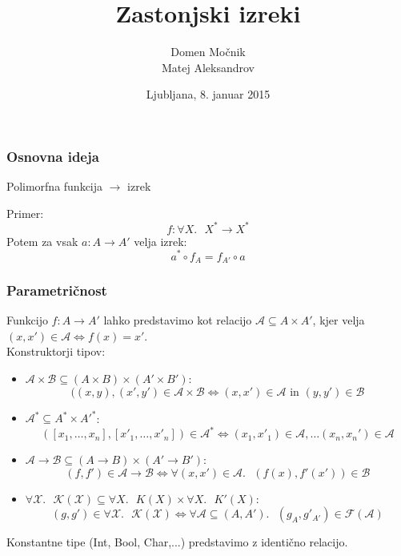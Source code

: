 \documentclass{beamer}
\title{Zastonjski izreki}
\author{Domen Močnik\\
Matej Aleksandrov}
\date{Ljubljana, 8. januar 2015}
\begin{document}
\begin{frame}
	\titlepage
	\end{frame}
	
	
	\begin{frame}
	\frametitle{Osnovna ideja}
	\begin{center}
	Polimorfna funkcija $\rightarrow$ izrek
	\end{center}
	\pause
	Primer:
	\\
	$$f: \forall X .\mbox{ } X^* \rightarrow X^*$$
	Potem za vsak $a: A \rightarrow A'$ velja izrek:
	$$  a^* \circ f_{A} = f_{A'} \circ a $$
	\end{frame}
	
	\begin{frame}
	\frametitle{Parametričnost}
		Funkcijo $f:A \to A'$ lahko predstavimo kot relacijo $\mathcal{A} \subseteq A \times A'$, kjer velja $(x,x')\in \mathcal{A} \Leftrightarrow  f(x)=x'$.\\
		\pause
		Konstruktorji tipov:
		\begin{itemize}
		\item $\mathcal{A}\times \mathcal{B} \subseteq (A \times B) \times (A' \times B')$:
		$$ ((x,y),(x',y') \in \mathcal{A}\times \mathcal{B} \Leftrightarrow (x,x') \in \mathcal{A} \mbox{ in } (y,y') \in \mathcal{B} $$
		\item $\mathcal{A}^* \subseteq A^* \times A'^*$:
		$$ ([x_1, \ldots, x_n],[x'_1, \ldots, x'_n]) \in \mathcal{A}^* \Leftrightarrow (x_1,x'_1) \in \mathcal{A},  \ldots  (x_n,x_n') \in \mathcal{A} $$
		\item $\mathcal{A}\to \mathcal{B} \subseteq (A \to B) \times (A' \to B')$:
		$$ (f,f') \in \mathcal{A}\to \mathcal{B} \Leftrightarrow  \forall (x,x') \in \mathcal{A}.\mbox{ } (f(x),f'(x')) \in \mathcal{B} $$
		\item $\forall \mathcal{X}.\mbox{ } \mathcal{K}(\mathcal{X}) \subseteq \forall X.\mbox{ } K(X) \times \forall X.\mbox{ } K'(X) $:
		$$ (g,g') \in \forall \mathcal{X}.\mbox{ } \mathcal{K}(\mathcal{X})  \Leftrightarrow  \forall \mathcal{A} \subseteq (A,A').\mbox{ } (g_A,g'_{A'}) \in \mathcal{F}(\mathcal{A})$$
		\end{itemize}
	Konstantne tipe (Int, Bool, Char,...) predstavimo z identično relacijo.
	
	\end{frame}
	
\end{document}
